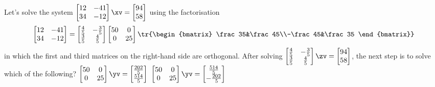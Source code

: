 \begin{activity}
Let's solve the system \(\begin{bmatrix} 12&-41\\34&-12 \end{bmatrix}\xv=\begin{bmatrix} 94\\58 \end{bmatrix}\) using the factorisation
\begin{equation*}
\begin{bmatrix} 12&-41\\34&-12 \end{bmatrix}
=\begin{bmatrix} \frac45&-\frac35\\\frac35&\frac45 \end{bmatrix}
\begin{bmatrix} 50&0\\0&25 \end{bmatrix}
\tr{\begin{bmatrix} \frac35&\frac45\\-\frac45&\frac35 \end{bmatrix}}
\end{equation*}
in which the first and third matrices on the right-hand side are orthogonal. 
After solving \(\begin{bmatrix} \frac45&-\frac35\\\frac35&\frac45 \end{bmatrix}\zv=\begin{bmatrix} 94\\58 \end{bmatrix}\), the next step is to solve which of the following?
{\(\begin{bmatrix} 50&0\\0&25 \end{bmatrix}\yv=\begin{bmatrix} \frac{202}5\\\frac{514}5 \end{bmatrix}\)}
{\(\begin{bmatrix} 50&0\\0&25 \end{bmatrix}\yv=\begin{bmatrix}  \frac{514}5\\-\frac{202}5 \end{bmatrix}\)}

\end{activity}
